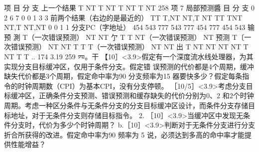 项
目
分
支
上一个结果
T
NT
T
NT
T
NT
T
NT
258
项
7
局部预测醬
目
分
支
0
2
6
7
0
0
1
3
3
前两个结果（右边的是最近的）
TT
T,NT
NT,T
NT
TT
TNT
NT,T
NT,NT
0
0
1
1
分支PC（字地址）
454
543
777
543
777
454
777
454
543
输
预
測
T（一次错误预测）
NT
NT
亇
T
T
NT（一次错误预测）
NT
预测
T〔一次错误预测）
NT
NT
T
T
T（一次错误预测）
NT
NT
出
T
NT
NT
NT
NT
T
NT
T
T
..
174
3.19
259
㓁。干
【10］<3.9>假定有一个深度流水线处理器，为其实现分支目标缓冲区，仅用于条件分支。假定错
误预测的代价都是4个周期，缓冲缺失代价都是3个周期，假定命中率为90%
分支频率为15%
器要快多少？假定每条指令的时钟周期数（CPI）为基本CPI，没有分支停顿。
［10/5］<3.9>考虑分支目标缓冲区，正确条件分支预测、错误预测和缓存缺失的代价分别为0、2
和2个时钟周期。考虑一种区分条件与无条件分支的分支目标缓冲区设计，而条件分支存储目
标地址，对于无条件分支则存储目标指令。
2. ［10］<3.9>当缓冲区中发现无条件分支时，代价为多少个时钟周期？
b.［10］<3.9>判断对于无条件分支进行分支折合所获得的改进。假定命中率为90%
频率为 5%
说，必须达到多高的命中率才能提供性能增益？